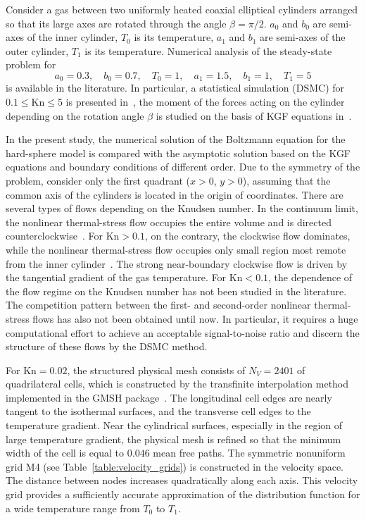 \documentclass[10pt]{article}
\newcommand{\Kn}{\mathrm{Kn}}
\begin{document}
Consider a gas between two uniformly heated coaxial elliptical cylinders arranged so
that its large axes are rotated through the angle \(\beta=\pi/2\).
\(a_0\) and \(b_0\) are semi-axes of the inner cylinder, \(T_0\) is its temperature,
\(a_1\) and \(b_1\) are semi-axes of the outer cylinder, \(T_1\) is its temperature.
Numerical analysis of the steady-state problem for
\[ a_0 = 0.3, \quad b_0 = 0.7, \quad T_0 = 1, \quad a_1 = 1.5, \quad b_1 = 1, \quad T_1 = 5 \]
is available in the literature.
In particular, a statistical simulation (DSMC) for \(0.1\le\Kn\le5\) is presented in~\cite{Sone1998},
the moment of the forces acting on the cylinder depending on the rotation angle \(\beta\)
is studied on the basis of KGF equations in~\cite{Rogozin2014}.

In the present study, the numerical solution of the Boltzmann equation for the hard-sphere model is compared
with the asymptotic solution based on the KGF equations and boundary conditions of different order.
Due to the symmetry of the problem, consider only the first quadrant (\(x>0\), \(y>0\)),
assuming that the common axis of the cylinders is located in the origin of coordinates.
There are several types of flows depending on the Knudsen number.
In the continuum limit, the nonlinear thermal-stress flow occupies the entire volume
and is directed counterclockwise~\cite{Sone2007,Rogozin2014}.
For \(\Kn>0.1\), on the contrary, the clockwise flow dominates,
while the nonlinear thermal-stress flow occupies only small region most remote from the inner cylinder~\cite{Sone1998}.
The strong near-boundary clockwise flow is driven by the tangential gradient of the gas temperature.
For \(\Kn<0.1\), the dependence of the flow regime on the Knudsen number has not been studied in the literature.
The competition pattern between the first- and second-order nonlinear thermal-stress flows
has also not been obtained until now.
In particular, it requires a huge computational effort to achieve an acceptable signal-to-noise ratio
and discern the structure of these flows by the DSMC method.

For \(\Kn=0.02\), the structured physical mesh consists of \(N_V=2401\) of quadrilateral cells,
which is constructed by the transfinite interpolation method implemented in the GMSH package~\cite{gmsh2009}.
The longitudinal cell edges are nearly tangent to the isothermal surfaces,
and the transverse cell edges to the temperature gradient.
Near the cylindrical surfaces, especially in the region of large temperature gradient,
the physical mesh is refined so that the minimum width of the cell is equal to \(0.046\) mean free paths.
The symmetric nonuniform grid M4 (see Table~\ref{table:velocity_grids}) is constructed in the velocity space.
The distance between nodes increases quadratically along each axis.
This velocity grid provides a sufficiently accurate approximation of the distribution function
for a wide temperature range from \(T_0\) to \(T_1\).
\end{document}
